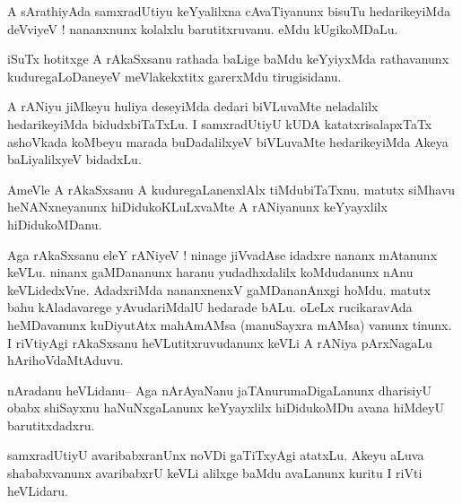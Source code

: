\documentclass{article}
\begin{document}
\begin{mn}%
A sArathiyAda samxradUtiyu keYyalilxna cAvaTiyanunx bisuTu hedarikeyiMda deVviyeV ! 
nananxnunx kolalxlu barutitxruvanu. eMdu kUgikoMDaLu.
\end{mn}

\begin{mn}%
iSuTx hotitxge A rAkaSxsanu rathada baLige baMdu keYyiyxMda rathavanunx kuduregaLoDaneyeV 
meVlakekxtitx garerxMdu tirugisidanu.
\end{mn}

\begin{mn}%
A rANiyu jiMkeyu huliya deseyiMda dedari biVLuvaMte neladalilx hedarikeyiMda bidudxbiTaTxLu. 
I samxradUtiyU kUDA katatxrisalapxTaTx ashoVkada koMbeyu marada buDadalilxyeV biVLuvaMte 
hedarikeyiMda Akeya baLiyalilxyeV bidadxLu.
\end{mn}

\begin{mn}%
AmeVle A rAkaSxsanu A kuduregaLanenxlAlx tiMdubiTaTxnu. matutx siMhavu heNANxneyanunx 
hiDidukoKLuLxvaMte A rANiyanunx keYyayxlilx hiDidukoMDanu.
\end{mn}

\begin{mn}%
Aga rAkaSxsanu eleY rANiyeV ! ninage jiVvadAse idadxre nananx mAtanunx keVLu. ninanx 
gaMDananunx haranu yudadhxdalilx koMdudanunx nAnu keVLidedxVne. AdadxriMda nananxnenxV 
gaMDananAnxgi hoMdu. matutx bahu kAladavarege yAvudariMdalU hedarade bALu. oLeLx 
rucikaravAda heMDavanunx kuDiyutAtx mahAmAMsa (manuSayxra mAMsa) vanunx tinunx. I riVtiyAgi 
rAkaSxsanu heVLutitxruvudanunx keVLi A rANiya pArxNagaLu hArihoVdaMtAduvu.
\end{mn}



\begin{mn}%
nAradanu heVLidanu-- Aga nArAyaNanu jaTAnurumaDigaLanunx dharisiyU obabx shiSayxnu 
haNuNxgaLanunx keYyayxlilx hiDidukoMDu avana hiMdeyU barutitxdadxru.
\end{mn}

\begin{mn}%
samxradUtiyU avaribabxranUnx noVDi gaTiTxyAgi atatxLu.  Akeyu aLuva shababxvanunx 
avaribabxrU keVLi alilxge baMdu avaLanunx kuritu I riVti heVLidaru. 
\end{mn}
\end{document}
